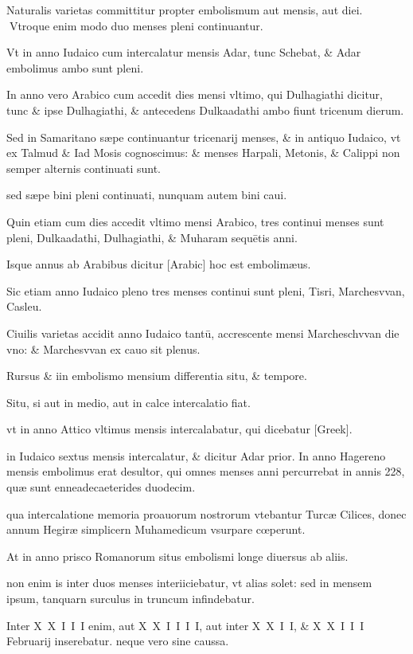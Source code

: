 \begin{parnumbers}

Naturalis varietas committitur propter embolismum  aut mensis, aut diei.
Vtroque enim modo duo menses pleni continuantur.

Vt in anno Iudaico cum intercalatur mensis Adar, tunc Schebat, \& Adar embolimus ambo sunt pleni.

In anno vero Arabico cum accedit dies mensi vltimo, qui Dulhagiathi dicitur, tunc \& ipse Dulhagiathi, \& antecedens Dulkaadathi ambo fiunt tricenum dierum.

Sed in Samaritano sæpe continuantur tricenarij menses, \& in antiquo Iudaico, vt ex Talmud \& Iad Mosis cognoscimus: \& menses Harpali, Metonis, \& Calippi non semper alternis continuati sunt.

sed sæpe bini pleni continuati, nunquam autem bini caui.

Quin etiam cum dies accedit vltimo mensi Arabico, tres continui menses sunt pleni, Dulkaadathi, Dulhagiathi, \& Muharam sequētis anni.

Isque annus ab Arabibus dicitur \textarabic{[Arabic]} hoc est embolimæus.

Sic etiam anno Iudaico pleno tres menses continui sunt pleni, Tisri, Marchesvvan, Casleu.

Ciuilis varietas accidit anno Iudaico tantū, accrescente mensi Marcheschvvan die vno: \& Marchesvvan ex cauo sit plenus.

Rursus \& iin embolismo mensium differentia situ, \& tempore.

Situ, si aut in medio, aut in calce intercalatio fiat.

vt in anno Attico vltimus mensis intercalabatur, qui dicebatur \textgreek{[Greek]}.

in Iudaico sextus mensis intercalatur, \& dicitur Adar prior. In anno Hagereno mensis embolimus erat desultor, qui omnes menses anni percurrebat in annis 228, quæ sunt enneadecaeterides duodecim.

qua intercalatione memoria proauorum nostrorum vtebantur Turcæ Cilices, donec annum Hegiræ simplicern  Muhamedicum vsurpare cœperunt.

At in anno prisco Romanorum situs embolismi longe diuersus ab aliis.

non enim is inter duos menses interiiciebatur, vt alias solet: sed in mensem ipsum, tanquarn surculus in truncum infindebatur.

Inter X X I I I enim, aut X X I I I I, aut inter X X I I, \& X X I I I Februarij inserebatur. neque vero sine caussa.


\end{parnumbers}
